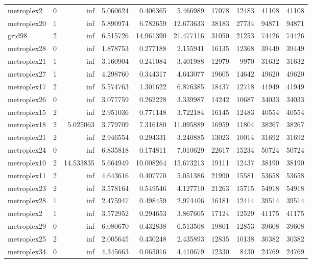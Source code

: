 \begin{longtable}{|l|r|r|r|r|r|r|r|r|r|}
metroplex2 & 0 & inf & 5.060624 & 0.406365 & 5.466989 & 17078 & 12483 & 41108 & 41108 \\
metroplex20 & 1 & inf & 5.890974 & 6.782659 & 12.673633 & 38183 & 27734 & 94871 & 94871 \\
grid98 & 2 & inf & 6.515726 & 14.961390 & 21.477116 & 31050 & 21253 & 74426 & 74426 \\
metroplex28 & 0 & inf & 1.878753 & 0.277188 & 2.155941 & 16135 & 12368 & 39449 & 39449 \\
metroplex21 & 1 & inf & 3.160904 & 0.241084 & 3.401988 & 12979 & 9970 & 31632 & 31632 \\
metroplex27 & 1 & inf & 4.298760 & 0.344317 & 4.643077 & 19605 & 14642 & 49620 & 49620 \\
metroplex17 & 2 & inf & 5.574763 & 1.301622 & 6.876385 & 18437 & 12718 & 41949 & 41949 \\
metroplex26 & 0 & inf & 3.077759 & 0.262228 & 3.339987 & 14242 & 10687 & 34033 & 34033 \\
metroplex15 & 2 & inf & 2.951036 & 0.771148 & 3.722184 & 16145 & 12483 & 40554 & 40554 \\
metroplex18 & 2 & 5.025063 & 3.779709 & 7.316180 & 11.095889 & 16959 & 11804 & 38267 & 38267 \\
metroplex21 & 2 & inf & 2.946554 & 0.294331 & 3.240885 & 13023 & 10014 & 31692 & 31692 \\
metroplex24 & 0 & inf & 6.835818 & 0.174811 & 7.010629 & 22617 & 15234 & 50724 & 50724 \\
metroplex10 & 2 & 14.533835 & 5.664949 & 10.008264 & 15.673213 & 19111 & 12437 & 38190 & 38190 \\
metroplex11 & 2 & inf & 4.643616 & 0.407770 & 5.051386 & 21990 & 15581 & 53658 & 53658 \\
metroplex23 & 2 & inf & 3.578164 & 0.549546 & 4.127710 & 21263 & 15715 & 54918 & 54918 \\
metroplex28 & 1 & inf & 2.475947 & 0.498459 & 2.974406 & 16181 & 12414 & 39514 & 39514 \\
metroplex2 & 1 & inf & 3.572952 & 0.294653 & 3.867605 & 17124 & 12529 & 41175 & 41175 \\
metroplex29 & 0 & inf & 6.080670 & 0.432838 & 6.513508 & 19801 & 12853 & 39608 & 39608 \\
metroplex25 & 2 & inf & 2.005645 & 0.430248 & 2.435893 & 12835 & 10138 & 30382 & 30382 \\
metroplex34 & 0 & inf & 4.345663 & 0.065016 & 4.410679 & 12330 & 8430 & 24769 & 24769 \\

\end{longtable}
